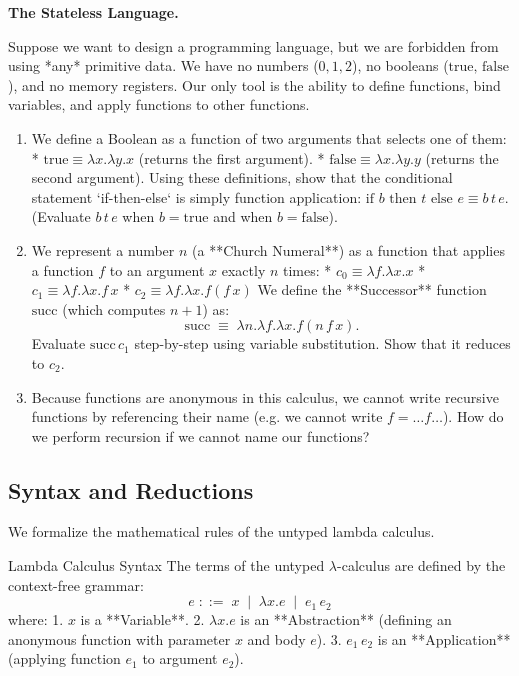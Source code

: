\documentclass[12pt, a4paper]{book}
\begin{document}
\begin{puzzlebox}
\textbf{The Stateless Language.}

Suppose we want to design a programming language, but we are forbidden from using *any* primitive data.
We have no numbers ($0, 1, 2$), no booleans ($\text{true, false}$), and no memory registers.
Our only tool is the ability to define functions, bind variables, and apply functions to other functions.
\begin{enumerate}[label=(\alph*), leftmargin=*]
  \item We define a Boolean as a function of two arguments that selects one of them:
        * $\text{true} \equiv \lambda x. \lambda y. x$ (returns the first argument).
        * $\text{false} \equiv \lambda x. \lambda y. y$ (returns the second argument).
        Using these definitions, show that the conditional statement `if-then-else` is simply function application: $\text{if } b \text{ then } t \text{ else } e \equiv b \, t \, e$.
        (Evaluate $b \, t \, e$ when $b = \text{true}$ and when $b = \text{false}$).
  \item We represent a number $n$ (a **Church Numeral**) as a function that applies a function $f$ to an argument $x$ exactly $n$ times:
        * $c_0 \equiv \lambda f. \lambda x. x$
        * $c_1 \equiv \lambda f. \lambda x. f \, x$
        * $c_2 \equiv \lambda f. \lambda x. f (f \, x)$
        We define the **Successor** function $\text{succ}$ (which computes $n+1$) as:
        \[
          \text{succ} \;\equiv\; \lambda n. \lambda f. \lambda x. f (n \, f \, x).
        \]
        Evaluate $\text{succ} \, c_1$ step-by-step using variable substitution. Show that it reduces to $c_2$.
  \item Because functions are anonymous in this calculus, we cannot write recursive functions by referencing their name (e.g. we cannot write $f = \dots f \dots$).
        How do we perform recursion if we cannot name our functions?
\end{enumerate}
\end{puzzlebox}

\subsection{Syntax and Reductions}

We formalize the mathematical rules of the untyped lambda calculus.

\begin{namedconcept}{Lambda Calculus Syntax}
The terms of the untyped $\lambda$-calculus are defined by the context-free grammar:
\[
  e \;::=\; x \;\mid\; \lambda x. e \;\mid\; e_1 \, e_2
\]
where:
1. $x$ is a **Variable**.
2. $\lambda x. e$ is an **Abstraction** (defining an anonymous function with parameter $x$ and body $e$).
3. $e_1 \, e_2$ is an **Application** (applying function $e_1$ to argument $e_2$).
\end{namedconcept}
\end{document}
